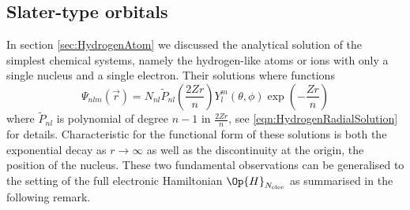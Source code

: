 \subsection{Slater-type orbitals}
\label{sec:STO}

In section \vref{sec:HydrogenAtom}
we discussed the analytical solution of the simplest chemical systems,
namely the hydrogen-like atoms or ions with only a single nucleus and a single electron.
Their solutions where functions
\[ \Psi_{nlm}(\vec{r}) = N_{nl} \tilde{P}_{nl}\left(\frac{2Zr}{n}\right)
	Y_l^m(\theta, \phi) \exp\left(-\frac{Zr}{n} \right) \]
where $\tilde{P}_{nl}$ is polynomial of degree $n-1$ in $\frac{2Zr}{n}$,
see \eqref{eqn:HydrogenRadialSolution} for details.
Characteristic for the functional form of these solutions
is both the exponential decay as $r \to \infty$ as well as
the discontinuity at the origin, \ie the position of the nucleus.
These two fundamental observations can be generalised to the setting of the
full electronic Hamiltonian $\Op{H}_{\Nelec}$ as summarised in the following remark.

